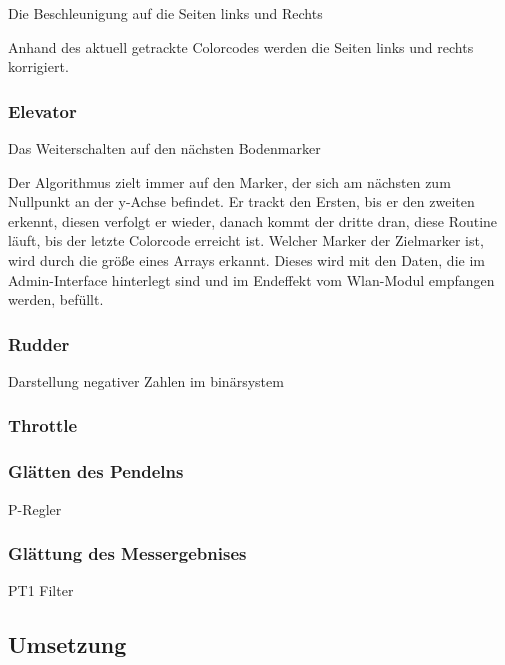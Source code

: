     Die Beschleunigung auf die Seiten links und Rechts

    Anhand des aktuell getrackte Colorcodes werden die Seiten links und rechts korrigiert. 



    \subsubsection{Elevator}

    Das Weiterschalten auf den nächsten Bodenmarker

    Der Algorithmus zielt immer auf den Marker, der sich am nächsten zum Nullpunkt an der y-Achse befindet. Er trackt den Ersten, bis er den zweiten erkennt, diesen verfolgt er wieder, danach kommt der dritte dran, diese Routine läuft, bis der letzte Colorcode erreicht ist. Welcher Marker der Zielmarker ist, wird durch die größe eines Arrays erkannt. Dieses wird mit den Daten, die im Admin-Interface hinterlegt sind und im Endeffekt vom Wlan-Modul empfangen werden, befüllt.

    \subsubsection{Rudder}


    Darstellung negativer Zahlen im binärsystem


    \subsubsection{Throttle}

    \subsubsection{Glätten des Pendelns}

    P-Regler

    \subsubsection{Glättung des Messergebnises}
    
    PT1 Filter


  \subsection{Umsetzung}

